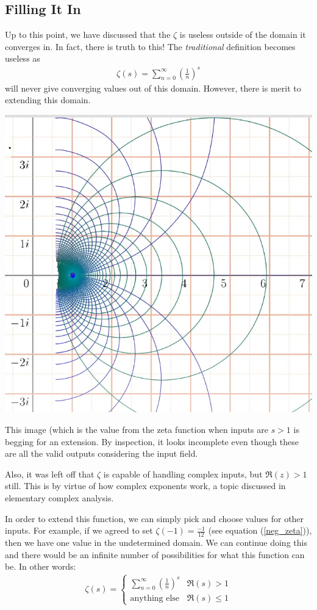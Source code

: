\documentclass[14pt]{extarticle}
\begin{document}
\subsection{Filling It In}
Up to this point, we have discussed that the $\zeta$ is useless outside of the domain it converges in. In fact, there is truth to this! The \textit{traditional} definition becomes useless as
\begin{align*}
	\zeta(s) = \sum_{n = 0}^{\infty} \left(\frac{1}{n}\right)^s
\end{align*}
will never give converging values out of this domain. However, there is merit to extending
this domain.

\begin{center}
	\includegraphics[scale=0.3]{zeta_undeveloped}
\end{center}
This image (which is the value from the zeta function when inputs are $s > 1$ is begging for an 
extension. By inspection, it looks incomplete even though these are all the valid outputs
considering the input field.

Also, it was left off that $\zeta$ is capable of handling complex inputs, but $\Re(z) > 1$
still. This is by virtue of how complex exponents work, a topic discussed in elementary
complex analysis.

In order to extend this function, we can simply pick and choose values for other inputs. For
example, if we agreed to set $\zeta(-1) = \frac{-1}{12}$ (see equation (\ref{neg_zeta})), then we have one value in the 
undetermined domain. We can continue doing this and there would be an infinite number of
possibilities for what this function can be. In other words:
\begin{align*}
	\zeta(s) = \begin{cases}
		\sum_{n = 0}^{\infty} \left(\frac{1}{n}\right)^s & \Re(s) > 1\\
		\text{anything else} & \Re(s) \leq 1
	\end{cases}
\end{align*}
\end{document}
